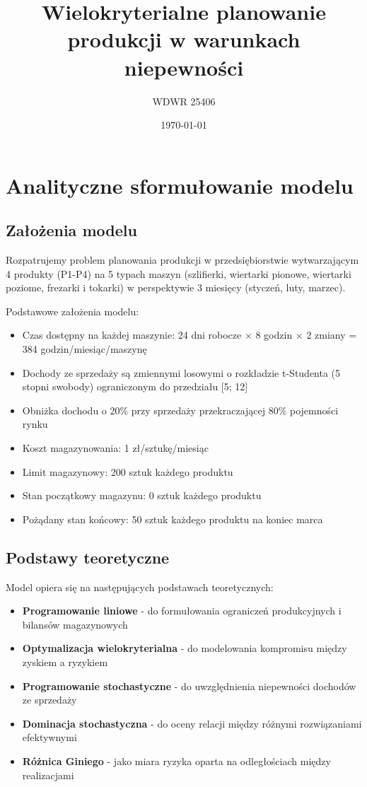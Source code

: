 \documentclass[12pt]{article}
\title{Wielokryterialne planowanie produkcji w warunkach niepewności}
\author{WDWR 25406}
\date{\today}
\begin{document}
\maketitle

\section{Analityczne sformułowanie modelu}

\subsection{Założenia modelu}

Rozpatrujemy problem planowania produkcji w przedsiębiorstwie wytwarzającym 4 produkty (P1-P4) na 5 typach maszyn (szlifierki, wiertarki pionowe, wiertarki poziome, frezarki i tokarki) w perspektywie 3 miesięcy (styczeń, luty, marzec).

Podstawowe założenia modelu:
\begin{itemize}
  \item Czas dostępny na każdej maszynie: 24 dni robocze $\times$ 8 godzin $\times$ 2 zmiany = 384 godzin/miesiąc/maszynę
  \item Dochody ze sprzedaży są zmiennymi losowymi o rozkładzie t-Studenta (5 stopni swobody) ograniczonym do przedziału [5; 12]
  \item Obniżka dochodu o 20\% przy sprzedaży przekraczającej 80\% pojemności rynku
  \item Koszt magazynowania: 1 zł/sztukę/miesiąc
  \item Limit magazynowy: 200 sztuk każdego produktu
  \item Stan początkowy magazynu: 0 sztuk każdego produktu
  \item Pożądany stan końcowy: 50 sztuk każdego produktu na koniec marca
\end{itemize}

\subsection{Podstawy teoretyczne}

Model opiera się na następujących podstawach teoretycznych:
\begin{itemize}
  \item \textbf{Programowanie liniowe} - do formułowania ograniczeń produkcyjnych i bilansów magazynowych
  \item \textbf{Optymalizacja wielokryterialna} - do modelowania kompromisu między zyskiem a ryzykiem
  \item \textbf{Programowanie stochastyczne} - do uwzględnienia niepewności dochodów ze sprzedaży
  \item \textbf{Dominacja stochastyczna} - do oceny relacji między różnymi rozwiązaniami efektywnymi
  \item \textbf{Różnica Giniego} - jako miara ryzyka oparta na odległościach między realizacjami
\end{itemize}
\end{document}
